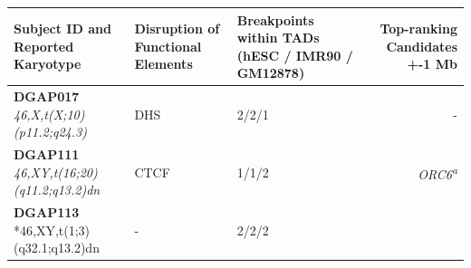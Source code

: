 \documentclass[a4paper,twoside=true,openright,parskip=full,chapterprefix=true,11pt,headings=normal,bibliography=totoc,listof=totoc,titlepage=on,captions=tableabove,draft=false]{scrreprt}
\theoremstyle{definition}
\theoremstyle{definition}
\theoremstyle{definition}
\theoremstyle{remark}
\begin{document}
\begin{longtable}[]{@{}lllr@{}}
\begin{minipage}[b]{0.25\columnwidth}
\textbf{Subject ID and Reported Karyotype}\strut
\end{minipage} & \begin{minipage}[b]{0.19\columnwidth}\raggedright
\textbf{Disruption of Functional Elements}\strut
\end{minipage} & \begin{minipage}[b]{0.26\columnwidth}\raggedright
\textbf{Breakpoints within TADs (hESC / IMR90 / GM12878)}\strut
\end{minipage} & \begin{minipage}[b]{0.18\columnwidth}\raggedleft
\textbf{Top-ranking Candidates +-1 Mb }\strut
\end{minipage}\tabularnewline
\midrule
\endhead
\begin{minipage}[t]{0.25\columnwidth}\raggedright
\textbf{DGAP017} \emph{46,X,t(X;10)(p11.2;q24.3)}\strut
\end{minipage} & \begin{minipage}[t]{0.19\columnwidth}\raggedright
DHS\strut
\end{minipage} & \begin{minipage}[t]{0.26\columnwidth}\raggedright
2/2/1\strut
\end{minipage} & \begin{minipage}[t]{0.18\columnwidth}\raggedleft
-\strut
\end{minipage}\tabularnewline
\begin{minipage}[t]{0.25\columnwidth}\raggedright
\textbf{DGAP111} \emph{46,XY,t(16;20)(q11.2;q13.2)dn}\strut
\end{minipage} & \begin{minipage}[t]{0.19\columnwidth}\raggedright
CTCF\strut
\end{minipage} & \begin{minipage}[t]{0.26\columnwidth}\raggedright
1/1/2\strut
\end{minipage} & \begin{minipage}[t]{0.18\columnwidth}\raggedleft
\emph{ORC6\textsuperscript{a}}\strut
\end{minipage}\tabularnewline
\begin{minipage}[t]{0.25\columnwidth}\raggedright
\textbf{DGAP113} *46,XY,t(1;3)(q32.1;q13.2)dn\strut
\end{minipage} & \begin{minipage}[t]{0.19\columnwidth}\raggedright
-\strut
\end{minipage} & \begin{minipage}[t]{0.26\columnwidth}\raggedright
2/2/2\strut
\end{minipage} & \begin{minipage}[t]{0.18\columnwidth}\raggedleft

\end{minipage}
\end{longtable}
\end{document}
